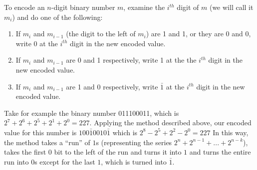 \documentclass{article}
\begin{document}
To encode an $n$-digit binary number $m$, examine the $i^{th}$ digit of $m$ (we will call it $m_i$) and do one of the following: %

\begin{enumerate}
\item If $m_i$ and $m_{i-1}$ (the digit to the left of $m_i$) are 1 and 1, or they are 0 and 0, write 0 at the $i^{th}$ digit in the new encoded value.
\item If $m_i$ and $m_{i-1}$ are 0 and 1 respectively, write 1 at the the $i^{th}$ digit in the new encoded value.
\item If $m_i$ and $m_{i-1}$ are 1 and 0 respectively, write $\bar{1}$ at the $i^{th}$ digit in the new encoded value.
\end{enumerate}

Take for example the binary number 011100011, which is $2^7 + 2^6 + 2^5 + 2^1 + 2^0 = 227$.
Applying the method described above, our encoded value for this number is $100\bar{1}0010\bar{1}$ which is $2^8 - 2^5 + 2^2 - 2^0 = 227$
In this way, the method takes a ``run'' of $1$s (representing the series $2^{n} + 2^{n-1} + ...
+ 2^{n-k}$), takes the first 0 bit to the left of the run and turns it into $1$ and turns the entire run into $0$s except for the last $1$, which is turned into $\bar{1}$.




\end{document}
